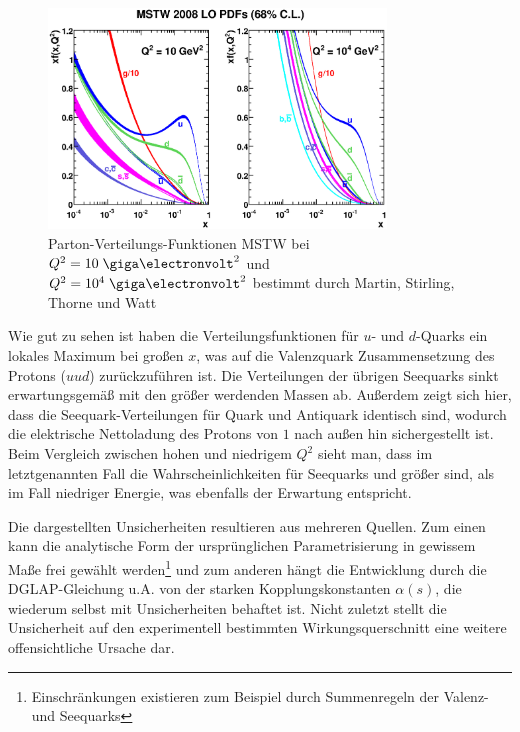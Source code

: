 \begin{figure}[h]
    \centering
    \includegraphics[width=0.8\textwidth]{img/mstw}
    \caption[Parton-Verteilungs-Funktionen MSTW bei $Q^2=10\GeV^2$ und
        $Q^2=10^4\GeV^2$]
        {Parton-Verteilungs-Funktionen MSTW bei \mbox{$Q^2=10\GeV^2$} und 
        \mbox{$Q^2=10^4\GeV^2$} bestimmt durch Martin, Stirling, Thorne und
        Watt \cite{Martin:2009iq}}
    \label{fig:mstw}
\end{figure}

Wie gut zu sehen ist haben die Verteilungsfunktionen für $u$- und $d$-Quarks
ein lokales Maximum bei großen $x$, was auf die Valenzquark Zusammensetzung des
Protons ($uud$) zurückzuführen ist. Die Verteilungen der übrigen Seequarks
sinkt erwartungsgemäß mit den größer werdenden Massen ab.  Außerdem zeigt sich
hier, dass die Seequark-Verteilungen für Quark und Antiquark identisch sind,
wodurch die elektrische Nettoladung des Protons von $1$ nach außen hin
sichergestellt ist. Beim Vergleich zwischen hohen und niedrigem $Q^2$ sieht
man, dass im letztgenannten Fall die Wahrscheinlichkeiten für Seequarks und
größer sind, als im Fall niedriger Energie, was ebenfalls der Erwartung
entspricht.

Die dargestellten Unsicherheiten resultieren aus mehreren Quellen.
Zum einen kann die analytische Form der ursprünglichen Parametrisierung in
gewissem Maße frei gewählt werden\footnote{Einschränkungen existieren zum
Beispiel durch Summenregeln der Valenz- und Seequarks} und zum anderen hängt
die Entwicklung durch die DGLAP-Gleichung u.A. von der starken
Kopplungskonstanten $\alpha(s)$, die wiederum selbst mit Unsicherheiten
behaftet ist. Nicht zuletzt stellt die Unsicherheit auf den experimentell
bestimmten Wirkungsquerschnitt eine weitere offensichtliche Ursache dar.





